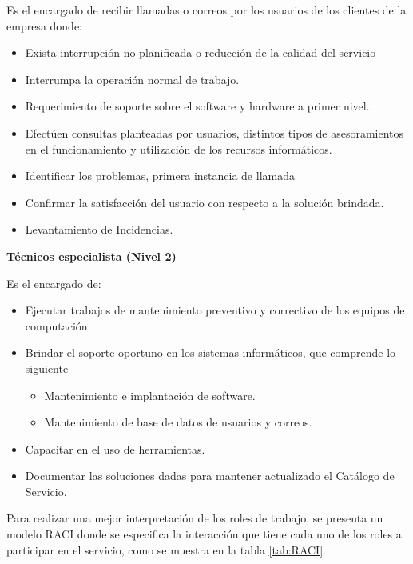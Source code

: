 Es el encargado de recibir llamadas o correos por los usuarios de los clientes de la empresa donde:

\begin{itemize}
\item Exista interrupción no planificada o reducción de la calidad del servicio
\item Interrumpa la operación normal de trabajo.
\item Requerimiento de soporte sobre el software y hardware a primer nivel.
\item Efectúen consultas planteadas por usuarios, distintos tipos de asesoramientos en el funcionamiento y utilización de los recursos informáticos.
\item Identificar los problemas, primera instancia de llamada 
\item Confirmar la satisfacción del usuario con respecto a la solución brindada.
\item Levantamiento de Incidencias.

\end{itemize}
\textbf{Técnicos especialista (Nivel 2)}

Es el encargado de:
\begin{itemize}
	\item Ejecutar trabajos de mantenimiento preventivo y correctivo de los equipos de computación.
	\item Brindar el soporte oportuno en los sistemas informáticos, que comprende lo siguiente
	\begin{itemize}
			\item Mantenimiento e implantación de software.
		\item Mantenimiento de base de datos de usuarios y correos.
		
	\end{itemize}

	\item Capacitar en el uso de herramientas.
	\item Documentar las soluciones dadas para mantener actualizado el Catálogo de Servicio.
	
\end{itemize}


Para realizar una mejor interpretación de los roles de trabajo,  se presenta un modelo RACI  donde se especifica la interacción que tiene cada uno de los roles a participar en el servicio, como se muestra en la tabla \ref{tab:RACI}.

